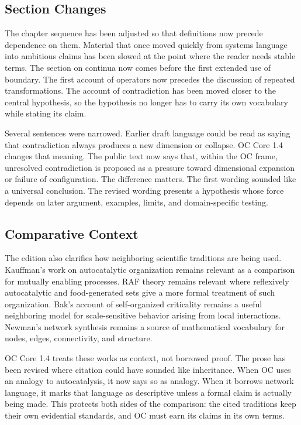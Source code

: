 \documentclass[11pt,a4paper,openany]{book}
\begin{document}
\subsection{Section Changes}
The chapter sequence has been adjusted so that definitions now precede dependence on them. Material that once moved quickly from systems language into ambitious claims has been slowed at the point where the reader needs stable terms. The section on continua now comes before the first extended use of boundary. The first account of operators now precedes the discussion of repeated transformations. The account of contradiction has been moved closer to the central hypothesis, so the hypothesis no longer has to carry its own vocabulary while stating its claim. \cite{kauffman_autocatalytic,raf_networks}\par
Several sentences were narrowed. Earlier draft language could be read as saying that contradiction always produces a new dimension or collapse. OC Core 1.4 changes that meaning. The public text now says that, within the OC frame, unresolved contradiction is proposed as a pressure toward dimensional expansion or failure of configuration. The difference matters. The first wording sounded like a universal conclusion. The revised wording presents a hypothesis whose force depends on later argument, examples, limits, and domain-specific testing.\par
\subsection{Comparative Context}
The edition also clarifies how neighboring scientific traditions are being used. Kauffman's work on autocatalytic organization remains relevant as a comparison for mutually enabling processes. RAF theory remains relevant where reflexively autocatalytic and food-generated sets give a more formal treatment of such organization. Bak's account of self-organized criticality remains a useful neighboring model for scale-sensitive behavior arising from local interactions. Newman's network synthesis remains a source of mathematical vocabulary for nodes, edges, connectivity, and structure. \cite{kauffman_autocatalytic,raf_networks}\par
OC Core 1.4 treats these works as context, not borrowed proof. The prose has been revised where citation could have sounded like inheritance. When OC uses an analogy to autocatalysis, it now says so as analogy. When it borrows network language, it marks that language as descriptive unless a formal claim is actually being made. This protects both sides of the comparison: the cited traditions keep their own evidential standards, and OC must earn its claims in its own terms.\par
\end{document}
